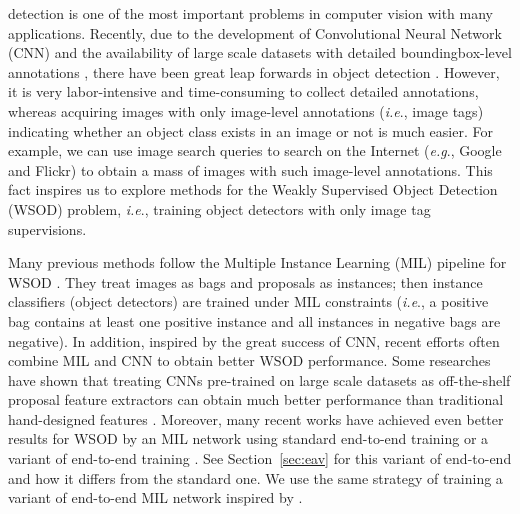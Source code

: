 \documentclass[10pt,journal,compsoc]{IEEEtran}
\def\eg{\emph{e.g}.} \def\Eg{\emph{E.g}.}
\def\ie{\emph{i.e}.} \def\Ie{\emph{I.e}.}
\begin{document}
 detection is one of the most important problems in computer vision with many applications.
Recently, due to the development of Convolutional Neural Network (CNN) \cite{Ref:Lecun1998,Ref:Krizhevsky2012} and the availability of large scale datasets with detailed boundingbox-level annotations \cite{Ref:Everingham2015,Ref:Russakovsky2015,Ref:Lin2014},
there have been great leap forwards in object detection \cite{Ref:Girshick2016,Ref:Girshick2015,Ref:Ren2017,Ref:Redmon2016,Ref:Liu2016,Ref:Zhang2018}.
However, it is very labor-intensive and time-consuming to collect detailed annotations,
whereas acquiring images with only image-level annotations (\ie, image tags) indicating whether an object class exists in an image or not is much easier.
For example, we can use image search queries to search on the Internet (\eg, Google and Flickr) to obtain a mass of images with such image-level annotations.
This fact inspires us to explore methods for the Weakly Supervised Object Detection (WSOD) problem, \ie, training object detectors with only image tag supervisions.

Many previous methods follow the Multiple Instance Learning (MIL) pipeline for WSOD \cite{Ref:Ren2016,Ref:Cinbis2017,Ref:Wang2015,Ref:Shi2017,Ref:Tang2017deep,Ref:Bilen2016,Ref:Kantorov2016,Ref:Diba2017}.
They treat images as bags and proposals as instances;
then instance classifiers (object detectors) are trained under MIL constraints
(\ie, a positive bag contains at least one positive instance and all instances in negative bags are negative).
In addition, inspired by the great success of CNN,
recent efforts often combine MIL and CNN to obtain better WSOD performance.
Some researches have shown that treating CNNs pre-trained on large scale datasets as off-the-shelf proposal feature extractors can obtain much better performance than traditional hand-designed features \cite{Ref:Ren2016,Ref:Cinbis2017,Ref:Wang2015,Ref:Shi2017}.
{Moreover, many recent works have achieved even better results for WSOD by an MIL network using standard end-to-end training \cite{Ref:Tang2017deep,Ref:Kantorov2016} or a variant of end-to-end training \cite{Ref:Bilen2016,Ref:Diba2017}.
See Section~\ref{sec:eav} for this variant of end-to-end and how it differs from the standard one.
We use the same strategy of training a variant of end-to-end MIL network inspired by \cite{Ref:Bilen2016,Ref:Diba2017}.}
\end{document}

